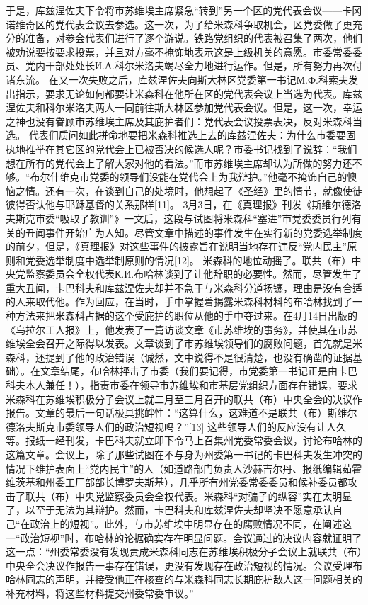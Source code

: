 于是，库兹涅佐夫下令将市苏维埃主席紧急“转到”另一个区的党代表会议——卡冈诺维奇区的党代表会议去参选。这一次，为了给米森科争取机会，区党委做了更充分的准备，对参会代表们进行了逐个游说。铁路党组织的代表被召集了两次，他们被劝说要按要求投票，并且对方毫不掩饰地表示这是上级机关的意愿。市委常委委员、党内干部处处长И.А.科尔米洛夫竭尽全力地进行运作。但是，所有努力再次付诸东流。
在又一次失败之后，库兹涅佐夫向斯大林区党委第一书记М.Ф.科索夫发出指示，要求无论如何都要让米森科在他所在区的党代表会议上当选为代表。库兹涅佐夫和科尔米洛夫两人一同前往斯大林区参加党代表会议。但是，这一次，幸运之神也没有眷顾市苏维埃主席及其庇护者们：党代表会议投票表决，反对米森科当选。
代表们质问如此拼命地要把米森科推选上去的库兹涅佐夫：为什么市委要固执地推举在其它区的党代会上已被否决的候选人呢？市委书记找到了说辞：“我们想在所有的党代会上了解大家对他的看法。”而市苏维埃主席却认为所做的努力还不够。“布尔什维克市党委的领导们没能在党代会上为我辩护。”他毫不掩饰自己的懊恼之情。还有一次，在谈到自己的处境时，他想起了《圣经》里的情节，就像使徒彼得否认他与耶稣基督的关系那样[11]。
3月3日，在《真理报》刊发《斯维尔德洛夫斯克市委“吸取了教训”》一文后，这段与试图将米森科“塞进”市党委委员行列有关的丑闻事件开始广为人知。尽管文章中描述的事件发生在实行新的党委选举制度的前夕，但是，《真理报》对这些事件的披露旨在说明当地存在违反“党内民主”原则和党委选举制度中选举制原则的情况[12]。
米森科的地位动摇了。联共（布）中央党监察委员会全权代表К.И.布哈林谈到了让他辞职的必要性。然而，尽管发生了重大丑闻，卡巴科夫和库兹涅佐夫却并不急于与米森科分道扬镳，理由是没有合适的人来取代他。作为回应，在当时，手中掌握着揭露米森科材料的布哈林找到了一种方法来把米森科占据的这个受庇护的职位从他的手中夺过来。在4月14日出版的《乌拉尔工人报》上，他发表了一篇访谈文章《市苏维埃的事务》，并使其在市苏维埃全会召开之际得以发表。文章谈到了市苏维埃领导们的腐败问题，首先就是米森科，还提到了他的政治错误（诚然，文中说得不是很清楚，也没有确凿的证据基础）。在文章结尾，布哈林抨击了市委（我们要记得，市党委第一书记正是由卡巴科夫本人兼任！），指责市委在领导市苏维埃和市基层党组织方面存在错误，要求米森科在苏维埃积极分子会议上就二月至三月召开的联共（布）中央全会的决议作报告。文章的最后一句话极具挑衅性：“这算什么，这难道不是联共（布）斯维尔德洛夫斯克市委领导人们的政治短视吗？”[13]
这些领导人们的反应没有让人久等。报纸一经刊发，卡巴科夫就立即下令马上召集州党委常委会议，讨论布哈林的这篇文章。会议上，除了那些试图在不与身为州委第一书记的卡巴科夫发生冲突的情况下维护表面上“党内民主”的人（如道路部门负责人沙赫吉尔丹、报纸编辑茹霍维茨基和州委工厂部部长博罗夫斯基），几乎所有州党委常委委员和候补委员都攻击了联共（布）中央党监察委员会全权代表。米森科“对骗子的纵容”实在太明显了，以至于无法为其辩护。然而，卡巴科夫和库兹涅佐夫却坚决不愿意承认自己“在政治上的短视”。此外，与市苏维埃中明显存在的腐败情况不同，在阐述这一“政治短视”时，布哈林的论据确实存在明显问题。会议通过的决议内容就证明了这一点：“州委常委没有发现责成米森科同志在苏维埃积极分子会议上就联共（布）中央全会决议作报告一事存在错误，更没有发现存在政治短视的情况。会议受理布哈林同志的声明，并接受他正在核查的与米森科同志长期庇护敌人这一问题相关的补充材料，将这些材料提交州委常委审议。”
